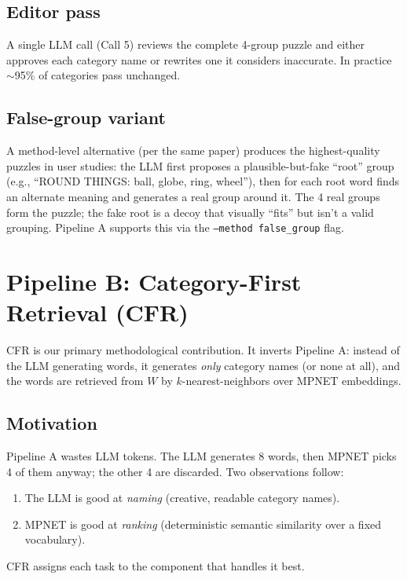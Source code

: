 \documentclass[11pt, letterpaper]{article}
\begin{document}
\subsection{Editor pass}
A single LLM call (Call 5) reviews the complete 4-group puzzle and either approves
each category name or rewrites one it considers inaccurate. In practice $\sim$95\%
of categories pass unchanged.

\subsection{False-group variant}
A method-level alternative (per the same paper) produces the highest-quality
puzzles in user studies: the LLM first proposes a plausible-but-fake ``root''
group (e.g., ``ROUND THINGS: ball, globe, ring, wheel''), then for each root word
finds an alternate meaning and generates a real group around it. The 4 real
groups form the puzzle; the fake root is a decoy that visually ``fits'' but isn't
a valid grouping. Pipeline A supports this via the \texttt{--method false\_group}
flag.

\section{Pipeline B: Category-First Retrieval (CFR)}
\label{sec:cfr}

CFR is our primary methodological contribution. It inverts Pipeline A: instead of
the LLM generating words, it generates \emph{only} category names (or none at all),
and the words are retrieved from $W$ by $k$-nearest-neighbors over MPNET embeddings.

\subsection{Motivation}
Pipeline A wastes LLM tokens. The LLM generates 8 words, then MPNET picks 4 of them
anyway; the other 4 are discarded. Two observations follow:
\begin{enumerate}[leftmargin=*, itemsep=0.1em]
\item The LLM is good at \emph{naming} (creative, readable category names).
\item MPNET is good at \emph{ranking} (deterministic semantic similarity over
a fixed vocabulary).
\end{enumerate}
CFR assigns each task to the component that handles it best.
\end{document}
